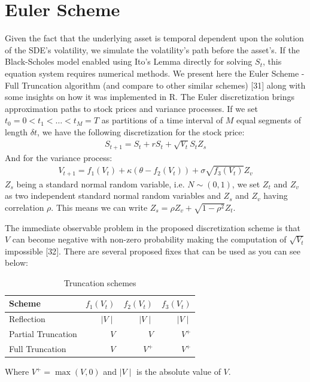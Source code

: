 \documentclass[12pt,twoside]{reedthesis}
\theoremstyle{definition}
\theoremstyle{definition}
\theoremstyle{remark}
\begin{document}
  \section{Euler Scheme}\label{euler-scheme}
  
  Given the fact that the underlying asset is temporal dependent upon the
  solution of the SDE's volatility, we simulate the volatility's path
  before the asset's. If the Black-Scholes model enabled using Ito's Lemma
  directly for solving \(S_t\), this equation system requires numerical
  methods. We present here the Euler Scheme - Full Truncation algorithm
  (and compare to other similar schemes) {[}31{]} along with some insights
  on how it was implemented in R. The Euler discretization brings
  approximation paths to stock prices and variance processes. If we set
  \(t_0 = 0 < t_1 < \dots < t_M = T\) as partitions of a time interval of
  \(M\) equal segments of length \(\delta t\), we have the following
  discretization for the stock price:
  \begin{align}
  S_{t+1} = S_t + rS_t + \sqrt{V_t} S_t Z_s
  \end{align}
  \noindent
  And for the variance process:
  \begin{align}
  V_{t+1} = f_1(V_{t}) + \kappa (\theta - f_2(V_{t})) + \sigma \sqrt{f_3(V_{t})} Z_v 
  \end{align}
  \noindent
  \(Z_s\) being a standard normal random variable, i.e. \(N\sim(0,1)\), we
  set \(Z_t\) and \(Z_v\) as two independent standard normal random
  variables and \(Z_s\) and \(Z_v\) having correlation \(\rho\). This
  means we can write \(Z_s = \rho Z_v + \sqrt{1-\rho^2} Z_t\).
  
  The immediate observable problem in the proposed discretization scheme
  is that \(V\) can become negative with non-zero probability making the
  computation of \(\sqrt{V_t}\) impossible {[}32{]}. There are several
  proposed fixes that can be used as you can see below:
  \begin{longtable}[t]{lrrr}
  \caption{\label{tab:fullt}Truncation schemes}\\
  \toprule
  Scheme & $f_1(V_{t})$ & $f_2(V_{t})$ & $f_3(V_{t})$\\
  \midrule
  Reflection & $\mid V \mid$ & $\mid V \mid$ & $\mid V \mid$\\
  Partial Truncation & $V$ & $V$ & $V^+$\\
  Full Truncation & $V$ & $V^+$ & $V^+$\\
  \bottomrule
  \end{longtable}
  Where \(V^+ = \max(V,0)\) and \(\mid V \mid\) is the absolute value of
  \(V\).
  
\end{document}
